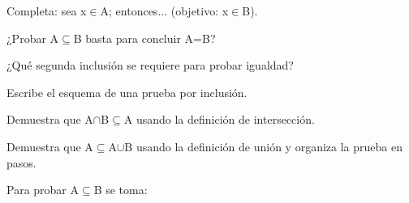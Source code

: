 \begin{activity}[id=dia-26-corta-03,type=short,weight=1]

Completa: sea x\(\in\)A; entonces... (objetivo: x\(\in\)B).

\end{activity}

\begin{activity}[id=dia-26-corta-04,type=short,weight=1]

¿Probar A\(\subseteq\)B basta para concluir A=B?

\end{activity}

\begin{activity}[id=dia-26-corta-05,type=short,weight=1]

¿Qué segunda inclusión se requiere para probar igualdad?

\end{activity}

\begin{activity}[id=dia-26-corta-06,type=short,weight=1]

Escribe el esquema de una prueba por inclusión.

\end{activity}

\begin{activity}[id=dia-26-desarrollo-01,type=long,weight=2]

Demuestra que A\(\cap\)B\(\subseteq\)A usando la definición de intersección.

\end{activity}

\begin{activity}[id=dia-26-desarrollo-02,type=long,weight=2]

Demuestra que A\(\subseteq\)A\(\cup\)B usando la definición de unión y organiza la prueba en pasos.

\end{activity}

\begin{activity}[id=dia-26-opcion-01,type=choice,weight=1]

Para probar A\(\subseteq\)B se toma:





\end{activity}

